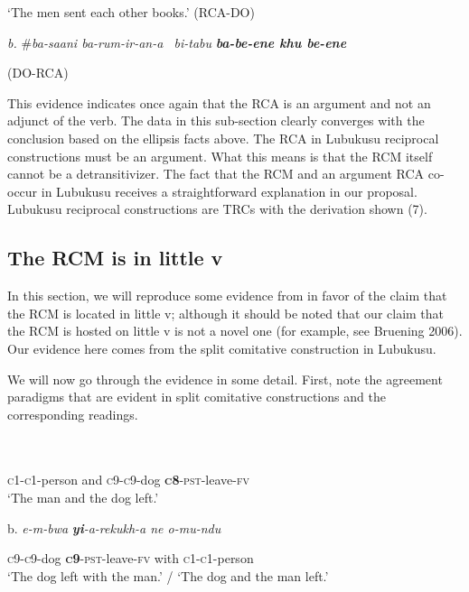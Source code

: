 \documentclass[output=paper]{langsci/langscibook}
\begin{document}
    ‘The men sent each other books.’          (RCA-DO)



  \textit{b.}  \#\textit{ba-saani   ba-rum-ir-an-a~  bi-tabu}   \textbf{\textit{ba-be-ene khu be-ene}} 



                      (DO-RCA)

This evidence indicates once again that the RCA is an argument and not an adjunct of the verb. The data in this sub-section clearly converges with the conclusion based on the ellipsis facts above. The RCA in Lubukusu reciprocal constructions must be an argument. What this means is that the RCM itself cannot be a detransitivizer. The fact that the RCM and an argument RCA co-occur in Lubukusu receives a straightforward explanation in our proposal. Lubukusu reciprocal constructions are TRCs with the derivation shown (7). 

 
\subsection{ The RCM is in little v}


In this section, we will reproduce some evidence from \citet{BakerEtAl2013} in favor of the claim that the RCM is located in little v; although it should be noted that our claim that the RCM is hosted on little v is not a novel one (for example, see Bruening 2006). Our evidence here comes from the split comitative construction in Lubukusu. 

  We will now go through the evidence in some detail. First, note the agreement paradigms that are evident in split comitative constructions and the corresponding readings. 



\ea\label{ex:}
\\
\ea\label{ex:}
 \\

       \textsc{c1-c1}-person   and  \textsc{c9-c9}-dog   \textbf{\textsc{c}}\textbf{8}-\textsc{pst}-leave-\textsc{fv} \\
\glt   ‘The man and the dog left.’
\z

\glt b.\textit{  e-m-bwa}  \textbf{\textit{yi}}\textit{-a-rekukh-a     ne   o-mu-ndu}
\z

       \textsc{c9-c9}-dog  \textbf{\textsc{c}}\textbf{9}-\textsc{pst}-leave-\textsc{fv}   with   \textsc{c1-c1}-person\\
\glt   ‘The dog left with the man.’ / ‘The dog and the man left.’
\z
\end{document}
